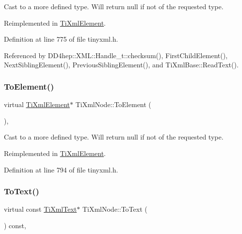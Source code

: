Cast to a more defined type. Will return null if not of the requested type. 



Reimplemented in \hyperlink{class_ti_xml_element_a940fc8aa953e0ef0de6e110b7d98b8ee}{Ti\+Xml\+Element}.



Definition at line 775 of file tinyxml.\+h.



Referenced by D\+D4hep\+::\+X\+M\+L\+::\+Handle\+\_\+t\+::checksum(), First\+Child\+Element(), Next\+Sibling\+Element(), Previous\+Sibling\+Element(), and Ti\+Xml\+Base\+::\+Read\+Text().

\hypertarget{class_ti_xml_node_aa65d000223187d22a4dcebd7479e9ebc}{}\label{class_ti_xml_node_aa65d000223187d22a4dcebd7479e9ebc} 
\subsubsection{\texorpdfstring{To\+Element()}{ToElement()}\hspace{0.1cm}{\footnotesize\ttfamily [2/2]}}
{\footnotesize\ttfamily virtual \hyperlink{class_ti_xml_element}{Ti\+Xml\+Element}$\ast$ Ti\+Xml\+Node\+::\+To\+Element (\begin{DoxyParamCaption}{ }\end{DoxyParamCaption})\hspace{0.3cm}{\ttfamily [inline]}, {\ttfamily [virtual]}}



Cast to a more defined type. Will return null if not of the requested type. 



Reimplemented in \hyperlink{class_ti_xml_element_a9def86337ea7a755eb41cac980f60c7a}{Ti\+Xml\+Element}.



Definition at line 794 of file tinyxml.\+h.

\hypertarget{class_ti_xml_node_a2591700660b308571c09166559a39332}{}\label{class_ti_xml_node_a2591700660b308571c09166559a39332} 
\subsubsection{\texorpdfstring{To\+Text()}{ToText()}\hspace{0.1cm}{\footnotesize\ttfamily [1/2]}}
{\footnotesize\ttfamily virtual const \hyperlink{class_ti_xml_text}{Ti\+Xml\+Text}$\ast$ Ti\+Xml\+Node\+::\+To\+Text (\begin{DoxyParamCaption}{ }\end{DoxyParamCaption}) const\hspace{0.3cm}{\ttfamily [inline]}, {\ttfamily [virtual]}}




